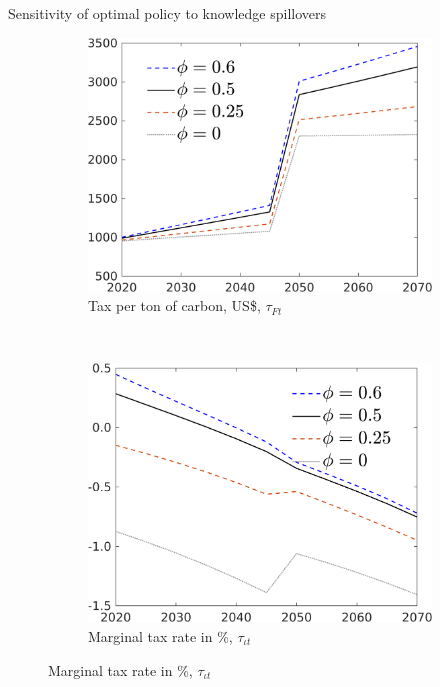 \documentclass[11pt,aspectratio=169]{beamer}
\begin{document}
\begin{frame}{Sensitivity of optimal policy to knowledge spillovers}
\hypertarget{sensphi}{}
\vspace{-3mm}
\begin{figure}[h!!]
	
	\begin{subfigure}{0.4\textwidth}		
		\caption{Tax per ton of carbon,  US\$, $\tau_{Ft}$}
		\includegraphics[width=1\textwidth]{../codding_model/own_basedOnFried/optimalPol_010922_revision/figures/all_13Sept22/Phi_Sens_Tauf_spillover0_knspil0_xgr0_nsk0_sep0_extern0_PV1_etaa0.79_lgd1.png}
	\end{subfigure}	
	\begin{minipage}[]{0.1\textwidth}
		\ 
	\end{minipage}
	\begin{subfigure}{0.4\textwidth}		
		\caption{Marginal tax rate in \%, $\tau_{\iota t}$}
		\includegraphics[width=1\textwidth]{../codding_model/own_basedOnFried/optimalPol_010922_revision/figures/all_13Sept22/Phi_Sens_dTaulAv_spillover0_knspil0_xgr0_nsk0_sep0_extern0_PV1_etaa0.79_lgd1.png}

\end{subfigure}
\end{figure}
\end{frame}
\end{document}
